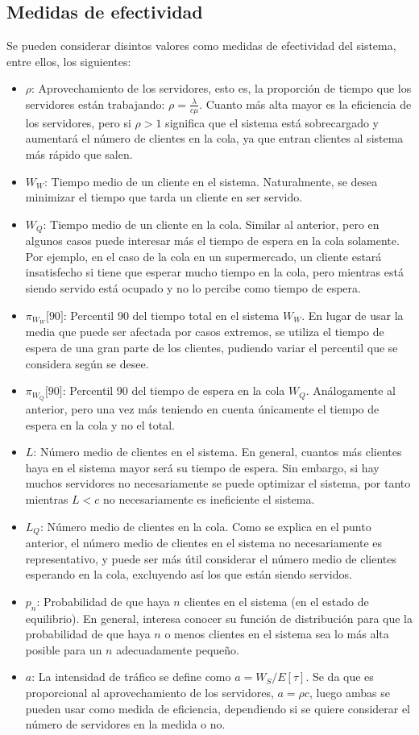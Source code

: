 \documentclass[a4paper,10pt]{scrartcl}
\theoremstyle{definition}
\numberwithin{equation}{section}
\begin{document}
\subsection{Medidas de efectividad}
Se pueden considerar disintos valores como medidas de efectividad del sistema, entre ellos, los siguientes:
\begin{itemize}
\item $\rho$:
  Aprovechamiento de los servidores, esto es, la proporción de tiempo que los servidores están trabajando: $\rho = \frac{\lambda}{c\mu}$. Cuanto más alta mayor es la eficiencia de los servidores, pero si $\rho > 1$ significa que el sistema está sobrecargado y aumentará el número de clientes en la cola, ya que entran clientes al sistema más rápido que salen.
\item $W_W$:
  Tiempo medio de un cliente en el sistema. Naturalmente, se desea minimizar el tiempo que tarda un cliente en ser servido.
\item $W_Q$:
  Tiempo medio de un cliente en la cola. Similar al anterior, pero en algunos casos puede interesar más el tiempo de espera en la cola solamente. Por ejemplo, en el caso de la cola en un supermercado, un cliente estará insatisfecho si tiene que esperar mucho tiempo en la cola, pero mientras está siendo servido está ocupado y no lo percibe como tiempo de espera.
\item $\pi_{W_W} \lbrack 90 \rbrack$:
  Percentil 90 del tiempo total en el sistema $W_W$. En lugar de usar la media que puede ser afectada por casos extremos, se utiliza el tiempo de espera de una gran parte de los clientes, pudiendo variar el percentil que se considera según se desee.
\item $\pi_{W_Q} \lbrack 90 \rbrack$:
  Percentil 90 del tiempo de espera en la cola $W_Q$. Análogamente al anterior, pero una vez más teniendo en cuenta únicamente el tiempo de espera en la cola y no el total.
\item $L$:
  Número medio de clientes en el sistema. En general, cuantos más clientes haya en el sistema mayor será su tiempo de espera. Sin embargo, si hay muchos servidores no necesariamente se puede optimizar el sistema, por tanto mientras $L<c$ no necesariamente es ineficiente el sistema.
\item $L_Q$:
  Número medio de clientes en la cola. Como se explica en el punto anterior, el número medio de clientes en el sistema no necesariamente es representativo, y puede ser más útil considerar el número medio de clientes esperando en la cola, excluyendo así los que están siendo servidos.
\item $p_n$:
  Probabilidad de que haya $n$ clientes en el sistema (en el estado de equilibrio). En general, interesa conocer su función de distribución para que la probabilidad de que haya $n$ o menos clientes en el sistema sea lo más alta posible para un $n$ adecuadamente pequeño.
\item $a$:
  La intensidad de tráfico se define como $a= W_S/E[\tau]$. Se da que es proporcional al aprovechamiento de los servidores, $a = \rho c$, luego ambas se pueden usar como medida de eficiencia, dependiendo si se quiere considerar el número de servidores en la medida o no.
\end{itemize}
\end{document}
